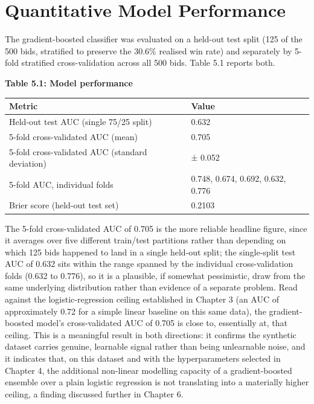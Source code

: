 \documentclass[12pt,oneside]{report}
\begin{document}
\hypertarget{quantitative-model-performance}{%
\section{Quantitative Model
Performance}\label{quantitative-model-performance}}

The gradient-boosted classifier was evaluated on a held-out test split
(125 of the 500 bids, stratified to preserve the 30.6\% realised win
rate) and separately by 5-fold stratified cross-validation across all
500 bids. Table 5.1 reports both.

\textbf{Table 5.1: Model performance}

\begin{longtable}[]{@{}ll@{}}
\toprule\noalign{}
Metric & Value \\
\midrule\noalign{}
\endhead
\bottomrule\noalign{}
\endlastfoot
Held-out test AUC (single 75/25 split) & 0.632 \\
5-fold cross-validated AUC (mean) & 0.705 \\
5-fold cross-validated AUC (standard deviation) & ± 0.052 \\
5-fold AUC, individual folds & 0.748, 0.674, 0.692, 0.632, 0.776 \\
Brier score (held-out test set) & 0.2103 \\
\end{longtable}

The 5-fold cross-validated AUC of 0.705 is the more reliable headline
figure, since it averages over five different train/test partitions
rather than depending on which 125 bids happened to land in a single
held-out split; the single-split test AUC of 0.632 sits within the range
spanned by the individual cross-validation folds (0.632 to 0.776), so it
is a plausible, if somewhat pessimistic, draw from the same underlying
distribution rather than evidence of a separate problem. Read against
the logistic-regression ceiling established in Chapter 3 (an AUC of
approximately 0.72 for a simple linear baseline on this same data), the
gradient-boosted model's cross-validated AUC of 0.705 is close to,
essentially at, that ceiling. This is a meaningful result in both
directions: it confirms the synthetic dataset carries genuine, learnable
signal rather than being unlearnable noise, and it indicates that, on
this dataset and with the hyperparameters selected in Chapter 4, the
additional non-linear modelling capacity of a gradient-boosted ensemble
over a plain logistic regression is not translating into a materially
higher ceiling, a finding discussed further in Chapter 6.
\end{document}
